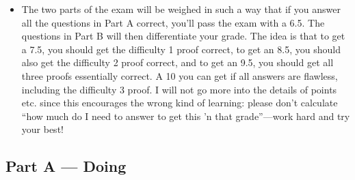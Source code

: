 \begin{itemize}
\begin{itemize}
    \end{itemize}
  
    \item The two parts of the exam will be weighed in such a way that
      if you answer all the questions in Part A correct,
      you'll pass the exam with a 6.5. The questions in Part B will then
      differentiate your grade. The idea is that to get a 7.5, you
      should get the difficulty 1 proof correct, to get an 8.5, you
      should also get the difficulty 2 proof correct, and to get an 9.5,
      you should get all three proofs essentially correct. A 10 you
      can get if all answers are flawless, including the difficulty 3
      proof. I will not go more into the details of points etc. since
      this encourages the wrong kind of learning: please don't
      calculate ``how much do I need to answer to get this 'n that
      grade''---work hard and try your best!
   
\end{itemize}

\subsection{Part A --- Doing}

